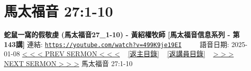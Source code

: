 \documentclass{book}
\begin{document}
\section{馬太福音 27:1-10}
\label{sec:499K9je19EI}
\textbf{蛇鼠一窩的假敬虔 (馬太福音27\_1-10) -  黃紹權牧師 [馬太福音信息系列 - 第143講]}
\newline
\newline
連結: \href{https://youtube.com/watch?v=499K9je19EI}{\texttt{https://youtube.com/watch?v=499K9je19EI}} ~~~~ 語音日期: 2025-01-08
\newline
\newline
\hyperref[sec:g49XieTOO9Y]{< < < PREV SERMON < < <}
~
\hyperlink{toc}{[返主目錄]}
~
\hyperref[ch:preacher16]{[返講員目錄]}
~
\hyperref[sec:ZN4O4BAmHMA]{> > > NEXT SERMON > > >}
\newline
\newline
馬太福音 27:1-10
\newline
\end{document}

